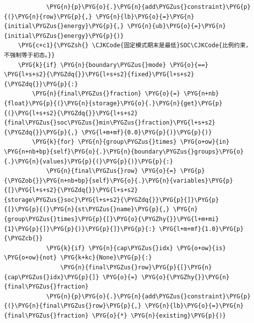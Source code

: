 \begin{Verbatim}
            \PYG{n}{p}\PYG{o}{.}\PYG{n}{add\PYGZus{}constraint}\PYG{p}{(}\PYG{n}{row}\PYG{p}{,} \PYG{n}{lb}\PYG{o}{=}\PYG{n}{initial\PYGZus{}energy}\PYG{p}{,} \PYG{n}{ub}\PYG{o}{=}\PYG{n}{initial\PYGZus{}energy}\PYG{p}{)}
    \PYG{c+c1}{\PYGZsh{} \CJKCode{固定模式期末是最低}SOC\CJKCode{比例约束，不强制等于初态。}}
    \PYG{k}{if} \PYG{n}{boundary\PYGZus{}mode} \PYG{o}{==} \PYG{l+s+s2}{\PYGZdq{}}\PYG{l+s+s2}{fixed}\PYG{l+s+s2}{\PYGZdq{}}\PYG{p}{:}
        \PYG{n}{final\PYGZus{}fraction} \PYG{o}{=} \PYG{n+nb}{float}\PYG{p}{(}\PYG{n}{storage}\PYG{o}{.}\PYG{n}{get}\PYG{p}{(}\PYG{l+s+s2}{\PYGZdq{}}\PYG{l+s+s2}{final\PYGZus{}soc\PYGZus{}min\PYGZus{}fraction}\PYG{l+s+s2}{\PYGZdq{}}\PYG{p}{,} \PYG{l+m+mf}{0.0}\PYG{p}{)}\PYG{p}{)}
        \PYG{k}{for} \PYG{n}{group\PYGZus{}times} \PYG{o+ow}{in} \PYG{n+nb+bp}{self}\PYG{o}{.}\PYG{n}{boundary\PYGZus{}groups}\PYG{o}{.}\PYG{n}{values}\PYG{p}{(}\PYG{p}{)}\PYG{p}{:}
            \PYG{n}{final\PYGZus{}row} \PYG{o}{=} \PYG{p}{\PYGZob{}}\PYG{n+nb+bp}{self}\PYG{o}{.}\PYG{n}{variables}\PYG{p}{[}\PYG{l+s+s2}{\PYGZdq{}}\PYG{l+s+s2}{storage\PYGZus{}soc}\PYG{l+s+s2}{\PYGZdq{}}\PYG{p}{]}\PYG{p}{[}\PYG{p}{(}\PYG{n}{st\PYGZus{}name}\PYG{p}{,} \PYG{n}{group\PYGZus{}times}\PYG{p}{[}\PYG{o}{\PYGZhy{}}\PYG{l+m+mi}{1}\PYG{p}{]}\PYG{p}{)}\PYG{p}{]}\PYG{p}{:} \PYG{l+m+mf}{1.0}\PYG{p}{\PYGZcb{}}
            \PYG{k}{if} \PYG{n}{cap\PYGZus{}idx} \PYG{o+ow}{is} \PYG{o+ow}{not} \PYG{k+kc}{None}\PYG{p}{:}
                \PYG{n}{final\PYGZus{}row}\PYG{p}{[}\PYG{n}{cap\PYGZus{}idx}\PYG{p}{]} \PYG{o}{=} \PYG{o}{\PYGZhy{}}\PYG{n}{final\PYGZus{}fraction}
            \PYG{n}{p}\PYG{o}{.}\PYG{n}{add\PYGZus{}constraint}\PYG{p}{(}\PYG{n}{final\PYGZus{}row}\PYG{p}{,} \PYG{n}{lb}\PYG{o}{=}\PYG{n}{final\PYGZus{}fraction} \PYG{o}{*} \PYG{n}{existing}\PYG{p}{)}
\end{Verbatim}

